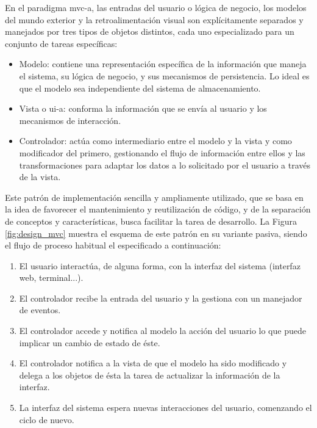 \documentclass[12pt,a4paper, twoside]{report}
\begin{document}
	En el paradigma \gls{mvc-a}, las entradas del usuario o lógica de negocio, los modelos del mundo exterior y la retroalimentación visual son explícitamente separados y manejados por tres tipos de objetos distintos, cada uno especializado para un conjunto de tareas específicas:
	
	\begin{itemize}
		\item Modelo: contiene una representación específica de la información que maneja el sistema, su lógica de negocio, y sus mecanismos de persistencia. Lo ideal es que el modelo sea independiente del sistema de almacenamiento.
		\item Vista o \gls{ui-a}: conforma la información que se envía al usuario y los mecanismos de interacción.
		\item Controlador: actúa como intermediario entre el modelo y la vista y como modificador del primero, gestionando el flujo de información entre ellos y las transformaciones para adaptar los datos a lo solicitado por el usuario a través de la vista.
	\end{itemize}

	 Este patrón de implementación sencilla y ampliamente utilizado, que se basa en la idea de favorecer el mantenimiento y reutilización de código, y de la separación de conceptos y características, busca facilitar la tarea de desarrollo. La Figura \ref{fig:design_mvc} muestra el esquema de este patrón en su variante pasiva, siendo el flujo de proceso habitual el especificado a continuación:
	
	\begin{enumerate}
		\item El usuario interactúa, de alguna forma, con la interfaz del sistema (interfaz web, terminal...).
		\item El controlador recibe la entrada del usuario y la gestiona con un manejador de eventos.
		\item El controlador accede y notifica al modelo la acción del usuario lo que puede implicar un cambio de estado de éste.
		\item El controlador notifica a la vista de que el modelo ha sido modificado y delega a los objetos de ésta la tarea de actualizar la información de la interfaz.
		\item La interfaz del sistema espera nuevas interacciones del usuario, comenzando el ciclo de nuevo. 
	\end{enumerate}
	
\end{document}
